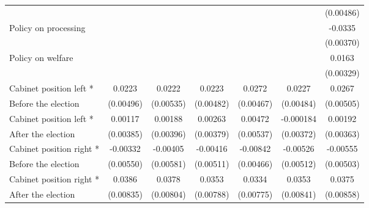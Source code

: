 \begin{table}[!ht]
\begin{tabular}{l*{6}{c}}
                    &                     &                     &                     &                     &                     &   (0.00486)         \\
[0,5em]
Policy on processing&                     &                     &                     &                     &                     &     -0.0335\sym{***}\\
                    &                     &                     &                     &                     &                     &   (0.00370)         \\
[0,5em]
Policy on welfare   &                     &                     &                     &                     &                     &      0.0163\sym{***}\\
                    &                     &                     &                     &                     &                     &   (0.00329)         \\
[0,5em]
Cabinet position left * &      0.0223\sym{***}&      0.0222\sym{***}&      0.0223\sym{***}&      0.0272\sym{***}&      0.0227\sym{***}&      0.0267\sym{***}\\
Before the election                    &   (0.00496)         &   (0.00535)         &   (0.00482)         &   (0.00467)         &   (0.00484)         &   (0.00505)         \\
[0,5em]
Cabinet position left * &     0.00117         &     0.00188         &     0.00263         &     0.00472         &   -0.000184         &     0.00192         \\
After the election                    &   (0.00385)         &   (0.00396)         &   (0.00379)         &   (0.00537)         &   (0.00372)         &   (0.00363)         \\
[0,5em]
Cabinet position right *&    -0.00332         &    -0.00405         &    -0.00416         &    -0.00842         &    -0.00526         &    -0.00555         \\
 Before the election                    &   (0.00550)         &   (0.00581)         &   (0.00511)         &   (0.00466)         &   (0.00512)         &   (0.00503)         \\
[0,5em]
Cabinet position right *&      0.0386\sym{***}&      0.0378\sym{***}&      0.0353\sym{***}&      0.0334\sym{***}&      0.0353\sym{***}&      0.0375\sym{***}\\
 After the election                    &   (0.00835)         &   (0.00804)         &   (0.00788)         &   (0.00775)         &   (0.00841)         &   (0.00858)         \\

\end{tabular}
\end{table}
